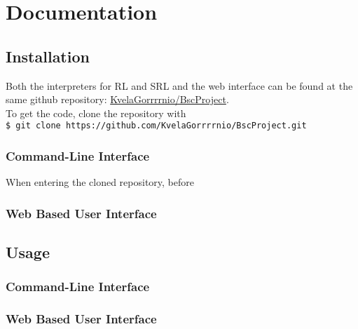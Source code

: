 \chapter*{Documentation}
%

\section*{Installation}
%

Both the interpreters for RL and SRL and the web interface can be found at the same github repository: \href{https://github.com/KvelaGorrrrnio/BscProject}{KvelaGorrrrnio/BscProject}.\\
To get the code, clone the repository with\\ \lstinline[language=bash]{$ git clone https://github.com/KvelaGorrrrnio/BscProject.git}\\

\subsection*{Command-Line Interface}
%

When entering the cloned repository, before

\subsection*{Web Based User Interface}
%

\section*{Usage}
%

\subsection*{Command-Line Interface}
%

\subsection*{Web Based User Interface}
%

